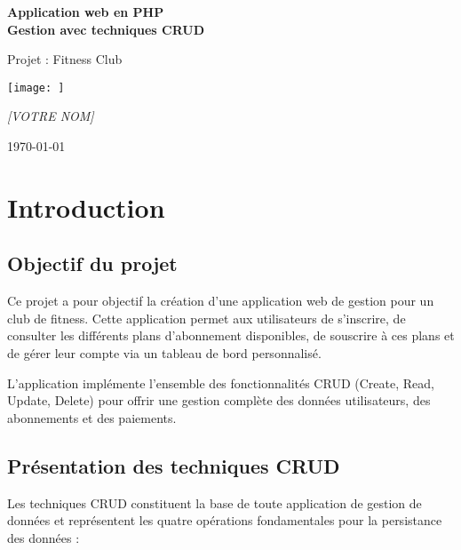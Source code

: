 \documentclass[12pt,a4paper]{report}
\begin{document}
\begin{titlepage}
    \centering
    \vspace*{1cm}
    {\Huge\bfseries Application web en PHP\\Gestion avec techniques CRUD\par}
    \vspace{2cm}
    {\large Projet : Fitness Club\par}
    \vspace{1.5cm}
    \texttt{[image: ]} %
    \vspace{2cm}
    {\Large\itshape [VOTRE NOM]\par}
    \vfill
    {\large \today\par}
\end{titlepage}

\tableofcontents
\newpage

\chapter{Introduction}

\section{Objectif du projet}
Ce projet a pour objectif la création d'une application web de gestion pour un club de fitness. Cette application permet aux utilisateurs de s'inscrire, de consulter les différents plans d'abonnement disponibles, de souscrire à ces plans et de gérer leur compte via un tableau de bord personnalisé.

L'application implémente l'ensemble des fonctionnalités CRUD (Create, Read, Update, Delete) pour offrir une gestion complète des données utilisateurs, des abonnements et des paiements.

\section{Présentation des techniques CRUD}
Les techniques CRUD constituent la base de toute application de gestion de données et représentent les quatre opérations fondamentales pour la persistance des données :
\end{document}
